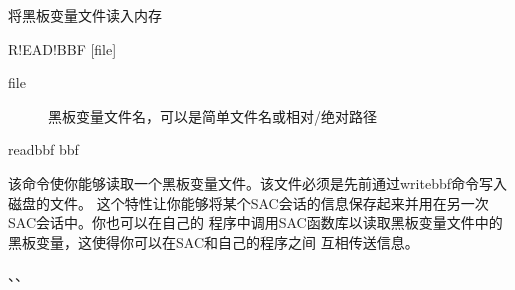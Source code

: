 \label{cmd:readbbf}

将黑板变量文件读入内存

\begin{SACSTX}
R!EAD!BBF [file]
\end{SACSTX}

\begin{description}
\item [file] 黑板变量文件名，可以是简单文件名或相对/绝对路径
\end{description}

\begin{SACDFT}
readbbf bbf
\end{SACDFT}

该命令使你能够读取一个黑板变量文件。该文件必须是先前通过writebbf命令写入磁盘的文件。
这个特性让你能够将某个SAC会话的信息保存起来并用在另一次SAC会话中。你也可以在自己的
程序中调用SAC函数库以读取黑板变量文件中的黑板变量，这使得你可以在SAC和自己的程序之间
互相传送信息。

、、
